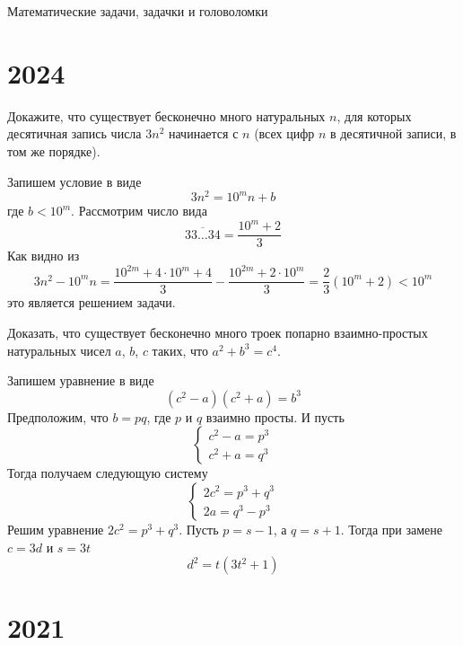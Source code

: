 \documentclass[11pt, a4paper]{template}
\begin{document}
\begin{titlepage}
  \begin{center}
	\Huge{Математические задачи, задачки и головоломки}
  \end{center}
\end{titlepage}

\chapter{2024}

\begin{exercise}
Докажите, что существует бесконечно много натуральных $n$, для которых десятичная запись числа $3n^2$ начинается с $n$ (всех цифр $n$ в десятичной записи, в том же порядке).
\end{exercise}

\begin{solution}
Запишем условие в виде
$$
3n^{2} = 10^{m} n + b
$$
где $b < 10^{m}$. Рассмотрим число вида 
$$
\overline{33\dots 34} = \frac{10^{m} + 2}{3} 
$$
Как видно из
$$
3n^{2} - 10^{m}n = \frac{10^{2m} + 4 \cdot 10^{m} + 4}{3} - \frac{10^{2m} + 2 \cdot 10^{m}}{3} = \frac{2}{3}(10^{m} + 2) < 10^{m}
$$
это является решением задачи. 
\end{solution}

\begin{exercise}
Доказать, что существует бесконечно много троек попарно взаимно-простых натуральных чисел $a$, $b$, $c$ таких, что $a^{2} + b^{3} = c^{4}$.
\end{exercise}

\begin{solution}
Запишем уравнение в виде
$$
(c^{2} - a)(c^{2} + a) = b^{3}
$$
Предположим, что $b = pq$, где $p$ и $q$ взаимно просты. И пусть 
$$
\begin{cases}
c^{2} - a = p^{3} \\
c^{2} + a = q^{3}
\end{cases}
$$
Тогда получаем следующую систему
$$
\begin{cases}
2c^{2} = p^{3} + q^{3} \\
2a = q^{3} - p^{3}
\end{cases}
$$
Решим уравнение $2c^{2} = p^{3} + q^{3}$. Пусть $p = s - 1$, а $q = s+1$. Тогда при замене $c = 3d$ и $s = 3t$
$$
d^{2} = t(3t^{2} + 1)
$$
\end{solution}

\chapter{2021}
\end{document}
